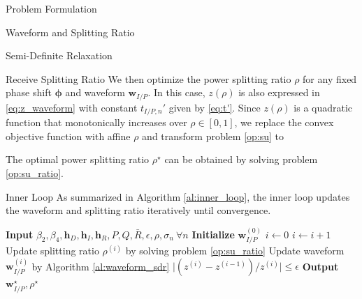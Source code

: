 \documentclass{IEEEtran}
\begin{document}
\begin{section}{Problem Formulation}
\begin{subsection}{Waveform and Splitting Ratio}
\begin{subsubsection}{Semi-Definite Relaxation}
			\begin{paragraph}{Receive Splitting Ratio}
				We then optimize the power splitting ratio $\rho$ for any fixed phase shift $\boldsymbol{\phi}$ and waveform $\boldsymbol{w}_{I/P}$. In this case, $z(\rho)$ is also expressed in \ref{eq:z_waveform} with constant $t_{I/P,n}'$ given by \ref{eq:t'}. Since $z(\rho)$ is a quadratic function that monotonically increases over $\rho \in [0, 1]$, we replace the convex objective function with affine $\rho$ and transform problem \ref{op:su} to
				\begin{maxi!}
					{\rho}{\rho}{\label{op:su_ratio}}{\label{eq:su_ratio_target}}
				\end{maxi!}
				The optimal power splitting ratio $\rho^\star$ can be obtained by solving problem \ref{op:su_ratio}.
			\end{paragraph}

			\begin{paragraph}{Inner Loop}
				As summarized in Algorithm \ref{al:inner_loop}, the inner loop updates the waveform and splitting ratio iteratively until convergence.
				\begin{algorithm}
					\caption{Inner Loop: Waveform and Splitting Ratio}
					\label{al:inner_loop}
					\begin{algorithmic}[1]
						\State \textbf{Input} $\beta_2,\beta_4,\boldsymbol{h}_D,\boldsymbol{h}_I,\boldsymbol{h}_R,P,Q,\bar{R},\epsilon,\rho,\sigma_n \ \forall n$
						\State \textbf{Initialize} $\boldsymbol{w}_{I/P}^{(0)}$
						\State $i \gets 0$
						\Repeat
						\State $i \gets i + 1$
						\State Update splitting ratio $\rho^{(i)}$ by solving problem \ref{op:su_ratio}
						\State Update waveform $\boldsymbol{w}_{I/P}^{(i)}$ by Algorithm \ref{al:waveform_sdr}
						\Until $\lvert (z^{(i)}-z^{(i-1)}) / z^{(i)} \rvert \le \epsilon$
						\State \textbf{Output} $\boldsymbol{w}_{I/P}^{\star}, \rho^{\star}$
					\end{algorithmic}
				\end{algorithm}
			\end{paragraph}
		\end{subsubsection}
	\end{subsection}


\end{section}
\end{document}
